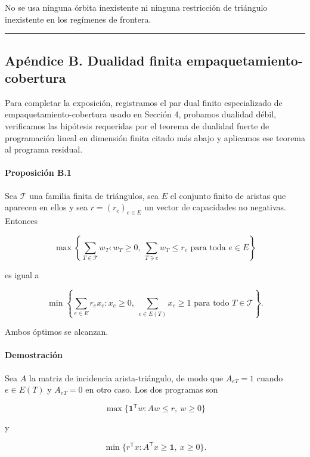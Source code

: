 \documentclass[spanish,11pt,a4paper]{article}
\begin{document}
No se usa ninguna órbita inexistente ni ninguna restricción de triángulo
inexistente en los regímenes de frontera.

\begin{center}\rule{0.5\linewidth}{0.5pt}\end{center}

\subsection{Apéndice B. Dualidad finita
empaquetamiento-cobertura}\label{apuxe9ndice-b.-dualidad-finita-empaquetamiento-cobertura}

Para completar la exposición, registramos el par dual finito
especializado de empaquetamiento-cobertura usado en Sección 4, probamos
dualidad débil, verificamos las hipótesis requeridas por el teorema de
dualidad fuerte de programación lineal en dimensión finita citado más
abajo y aplicamos ese teorema al programa residual.

\paragraph{Proposición B.1}\label{proposiciuxf3n-b.1}

Sea \(\mathcal T\) una familia finita de triángulos, sea \(E\) el
conjunto finito de aristas que aparecen en ellos y sea
\(r=(r_e)_{e\in E}\) un vector de capacidades no negativas. Entonces

\[
\max\left\{
\sum_{T\in\mathcal T}w_T:
w_T\ge0,\ 
\sum_{T\ni e}w_T\le r_e
\text{ para toda }e\in E
\right\}
\]

es igual a

\[
\min\left\{
\sum_{e\in E}r_ex_e:
x_e\ge0,\ 
\sum_{e\in E(T)}x_e\ge1
\text{ para todo }T\in\mathcal T
\right\}.
\]

Ambos óptimos se alcanzan.

\paragraph{Demostración}\label{demostraciuxf3n-2}

Sea \(A\) la matriz de incidencia arista-triángulo, de modo que
\(A_{eT}=1\) cuando \(e\in E(T)\) y \(A_{eT}=0\) en otro caso. Los dos
programas son

\[
\max\{\mathbf 1^{\mathsf T}w:Aw\le r,\ w\ge0\}
\]

y

\[
\min\{r^{\mathsf T}x:A^{\mathsf T}x\ge\mathbf 1,\ x\ge0\}.
\]
\end{document}
